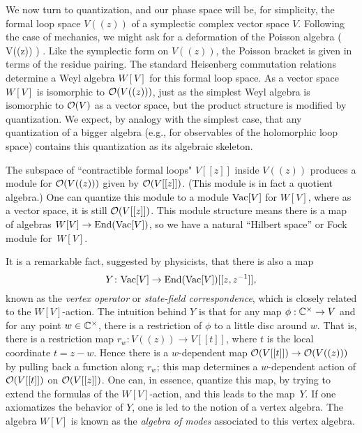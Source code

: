 \documentclass[11pt]{amsart}
\begin{document}
We now turn to quantization, and our phase space will be, for simplicity, the formal loop space $V((z))$ of a symplectic complex vector space $V$.
Following the case of mechanics, we might ask for a deformation of the Poisson algebra
\beqn
\cO\left( V((z)) \right) .
\eeqn
Like the symplectic form on $V((z))$, the Poisson bracket is given in terms of the residue pairing.
The standard Heisenberg commutation relations determine a Weyl algebra $W[V]$ for this formal loop space.
As a vector space $W[V]$ is isomorphic to $\mathcal O(V((z)))$, 
just as the simplest Weyl algebra is isomorphic to $\mathcal O(V)$ as a vector space,
but the product structure is modified by quantization.
We expect, by analogy with the simplest case, that any quantization of a bigger algebra (e.g., for observables of the holomorphic loop space) contains this quantization as its algebraic skeleton.

The subspace of ``contractible formal loops" $V[[z]]$ inside $V((z))$ produces a module for $\mathcal O(V((z)))$ given by $\mathcal O(V[[z]])$. 
(This module is in fact a quotient algebra.)
One can quantize this module to a module ${\rm Vac}[V]$ for $W[V]$,
where as a vector space, it is still $\mathcal O(V[[z]])$.
This module structure means there is a map of algebras $W[V] \to {\rm End}({\rm Vac}[V])$,
so we have a natural ``Hilbert space'' or Fock module for~$W[V]$.

It is a remarkable fact, suggested by physicists, that there is also a map
\[
Y \colon {\rm Vac}[V] \to {\rm End}({\rm Vac}[V])[[z, z^{-1}]],
\]
known as the {\em vertex operator} or {\em state-field correspondence},
which is closely related to the $W[V]$-action.
The intuition behind $Y$ is that for any map $\phi: \mathbb C^\times \to V$ and for any point $w \in \mathbb C^\times$, 
there is a restriction of $\phi$ to a little disc around $w$.
That is, there is a restriction map $r_w: V((z)) \to V[[t]]$, where $t$ is the local coordinate $t = z-w$.
Hence there is a $w$-dependent map $\mathcal O(V[[t]]) \to \mathcal O(V((z)))$ by pulling back a function along $r_w$;
this map determines a $w$-dependent action of $\mathcal O(V[[t]])$ on $\mathcal O(V[[z]])$.
One can, in essence, quantize this map, by trying to extend the formulas of the $W[V]$-action,
and this leads to the map~$Y$.
If one axiomatizes the behavior of $Y$, one is led to the notion of a vertex algebra.
The algebra $W[V]$ is known as the \textit{algebra of modes} associated to this vertex algebra.
\end{document}
